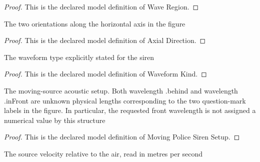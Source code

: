 \begin{proof}
  This is the declared model definition of Wave Region.
\end{proof}
\begin{definition}
  \label{def:physics:phyx-mini-0193:phyxminiproblems-problemphyxmini0193-axialdirection}
  The two orientations along the horizontal axis in the figure
\end{definition}
\begin{proof}
  This is the declared model definition of Axial Direction.
\end{proof}
\begin{definition}
  \label{def:physics:phyx-mini-0193:phyxminiproblems-problemphyxmini0193-waveformkind}
  The waveform type explicitly stated for the siren
\end{definition}
\begin{proof}
  This is the declared model definition of Waveform Kind.
\end{proof}
\begin{definition}
  \label{def:physics:phyx-mini-0193:phyxminiproblems-problemphyxmini0193-movingpolicesirensetup}
  The moving-source acoustic setup. Both wavelength .behind and wavelength .inFront are unknown physical lengths corresponding to the two question-mark labels in the figure. In particular, the requested front wavelength is not assigned a numerical value by this structure
\end{definition}
\begin{proof}
  This is the declared model definition of Moving Police Siren Setup.
\end{proof}
\begin{definition}
  \label{def:physics:phyx-mini-0193:phyxminiproblems-problemphyxmini0193-sourcevelocityrelativetoairinmeterspersecond}
  The source velocity relative to the air, read in metres per second
\end{definition}
